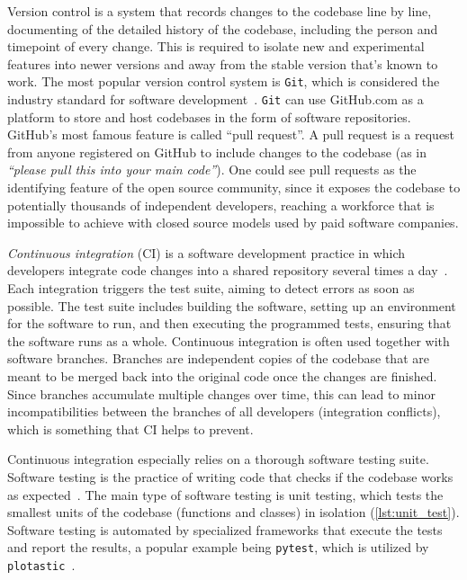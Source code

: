 Version control is a system that records changes to the codebase line by line,
documenting of the detailed history of the codebase, including the person and
timepoint of every change. This is required to isolate new and experimental
features into newer versions and away from the stable version that's known to
work. The most popular version control system is \texttt{Git}, which is
considered the industry standard for software
development~\cite{chaconProGit2014}. \texttt{Git} can use GitHub.com as a
platform to store and host codebases in the form of software repositories.
GitHub's most famous feature is called ``pull request''. A pull request is a
request from anyone registered on GitHub to include changes to the codebase (as
in \textit{``please pull this into your main code''}). One could see pull
requests as the identifying feature of the open source community, since it
exposes the codebase to potentially thousands of independent developers,
reaching a workforce that is impossible to achieve with closed source models
used by paid software companies.

\emph{Continuous integration} (CI) is a software development practice in which
developers integrate code changes into a shared repository several times a
day~\cite{duvallContinuousIntegrationImproving2007}. Each integration triggers the test suite,
aiming to detect errors as soon as possible. The test suite includes building
the software, setting up an environment for the software to run, and then
executing the programmed tests, ensuring that the software runs as a whole.
Continuous integration is often used together with software branches. Branches
are independent copies of the codebase that are meant to be merged back into the
original code once the changes are finished. Since branches accumulate multiple
changes over time, this can lead to minor incompatibilities between the branches
of all developers (integration conflicts), which is something that CI helps to
prevent.

Continuous integration especially relies on a thorough software testing suite.
Software testing is the practice of writing code that checks if the codebase
works as expected~\cite{10.5555/2161638}. The main type of software testing is
unit testing, which tests the smallest units of the codebase (functions and
classes) in isolation (\autoref{lst:unit_test}). Software testing is automated
by specialized frameworks that execute the tests and report the results, a
popular example being \texttt{pytest}, which is utilized by
\texttt{plotastic}~\cite{pytestx.y}.

